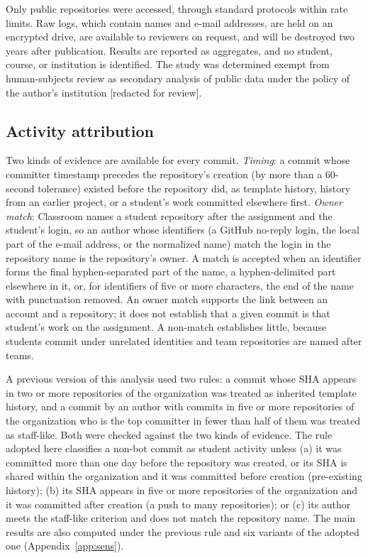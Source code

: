 \documentclass[acmsmall,screen,review,anonymous]{acmart}
\begin{document}
Only public repositories were accessed, through standard protocols within rate limits. Raw logs, which contain names and e-mail addresses, are held on an encrypted drive, are available to reviewers on request, and will be destroyed two years after publication. Results are reported as aggregates, and no student, course, or institution is identified. The study was determined exempt from human-subjects review as secondary analysis of public data under the policy of the author's institution [redacted for review].

\subsection{Activity attribution}
\label{sec:attribution}

Two kinds of evidence are available for every commit. \textit{Timing}: a commit whose committer timestamp precedes the repository's creation (by more than a 60-second tolerance) existed before the repository did, as template history, history from an earlier project, or a student's work committed elsewhere first. \textit{Owner match}: Classroom names a student repository after the assignment and the student's login, so an author whose identifiers (a GitHub no-reply login, the local part of the e-mail address, or the normalized name) match the login in the repository name is the repository's owner. A match is accepted when an identifier forms the final hyphen-separated part of the name, a hyphen-delimited part elsewhere in it, or, for identifiers of five or more characters, the end of the name with punctuation removed. An owner match supports the link between an account and a repository; it does not establish that a given commit is that student's work on the assignment. A non-match establishes little, because students commit under unrelated identities and team repositories are named after teams.

A previous version of this analysis used two rules: a commit whose SHA appears in two or more repositories of the organization was treated as inherited template history, and a commit by an author with commits in five or more repositories of the organization who is the top committer in fewer than half of them was treated as staff-like. Both were checked against the two kinds of evidence. The rule adopted here classifies a non-bot commit as student activity unless (a) it was committed more than one day before the repository was created, or its SHA is shared within the organization and it was committed before creation (pre-existing history); (b) its SHA appears in five or more repositories of the organization and it was committed after creation (a push to many repositories); or (c) its author meets the staff-like criterion and does not match the repository name. The main results are also computed under the previous rule and six variants of the adopted one (Appendix~\ref{app:sens}).
\end{document}
